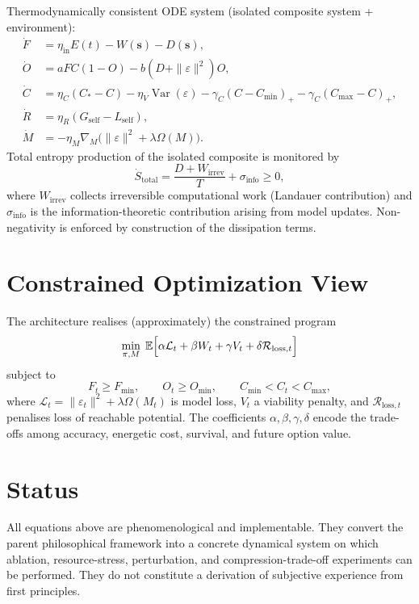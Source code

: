 \documentclass[11pt,a4paper]{article}
\begin{document}
Thermodynamically consistent ODE system (isolated composite system + environment):
\begin{align}
\dot F&=\eta_{\mathrm{in}}E(t)-W(\mathbf{s})-D(\mathbf{s}),\\
\dot O&=aFC(1-O)-b(D+\|\varepsilon\|^2)O,\\
\dot C&=\eta_C(C_*-C)-\eta_V\operatorname{Var}(\varepsilon)
       -\gamma_C(C-C_{\min})_+-\gamma_C(C_{\max}-C)_+,\\
\dot R&=\eta_R(G_{\mathrm{self}}-L_{\mathrm{self}}),\\
\dot M&=-\eta_M\nabla_M\bigl(\|\varepsilon\|^2+\lambda\Omega(M)\bigr).
\end{align}
Total entropy production of the isolated composite is monitored by
\begin{equation}
\dot S_{\mathrm{total}}=\frac{D+W_{\mathrm{irrev}}}{T}+\sigma_{\mathrm{info}}\ge 0,
\end{equation}
where \(W_{\mathrm{irrev}}\) collects irreversible computational work (Landauer contribution) and \(\sigma_{\mathrm{info}}\) is the information-theoretic contribution arising from model updates. Non-negativity is enforced by construction of the dissipation terms.

\section{Constrained Optimization View}

The architecture realises (approximately) the constrained program
\begin{equation}
\min_{\pi,M}\;\mathbb{E}\Bigl[\alpha\mathcal{L}_t+\beta W_t+\gamma V_t+\delta\mathcal{R}_{\mathrm{loss},t}\Bigr]
\end{equation}
subject to
\[
F_t\ge F_{\min},\qquad O_t\ge O_{\min},\qquad C_{\min}<C_t<C_{\max},
\]
where \(\mathcal{L}_t=\|\varepsilon_t\|^2+\lambda\Omega(M_t)\) is model loss, \(V_t\) a viability penalty, and \(\mathcal{R}_{\mathrm{loss},t}\) penalises loss of reachable potential. The coefficients \(\alpha,\beta,\gamma,\delta\) encode the trade-offs among accuracy, energetic cost, survival, and future option value.

\section*{Status}

All equations above are phenomenological and implementable. They convert the parent philosophical framework into a concrete dynamical system on which ablation, resource-stress, perturbation, and compression-trade-off experiments can be performed. They do not constitute a derivation of subjective experience from first principles.
\end{document}

